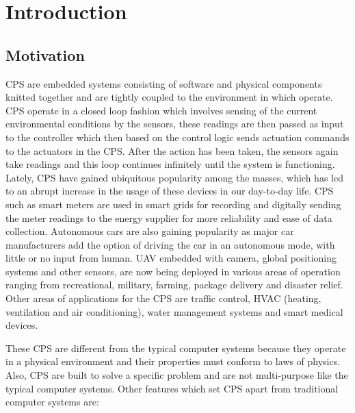 
\chapter{Introduction}
\label{ch:Introduction}

\section{Motivation}
\label{sec:Motivation}

\ac{CPS} are embedded systems consisting of software and physical components knitted together and are tightly coupled to the environment in which operate. \ac{CPS} operate in a closed loop fashion which involves sensing of the current environmental conditions by the sensors, these readings are then passed as input to the controller which then based on the control logic sends actuation commands to the actuators in the \ac{CPS}. After the action has been taken, the sensors again take readings and this loop continues infinitely until the system is functioning. Lately, \ac{CPS} have gained ubiquitous popularity among the masses, which has led to an abrupt increase in the usage of these devices in our day-to-day life. \ac{CPS} such as smart meters are used in smart grids\cite{karnouskos2011cyber, ericsson2010cyber} for recording and digitally sending the meter readings to the energy supplier for more reliability and ease of data collection. Autonomous cars\cite{checkoway2011comprehensive, yang2014vehicle} are also gaining popularity as major car manufacturers add the option of driving the car in an autonomous mode, with little or no input from human. \ac{UAV}\cite{javaid2012cyber, mohammed2014uavs} embedded with camera, global positioning systems and other sensors, are now being deployed in various areas of operation ranging from recreational, military, farming, package delivery and disaster relief. Other areas of applications for the \ac{CPS} are traffic control, HVAC (heating, ventilation and air conditioning), water management systems and smart medical devices.

These \ac{CPS} are different from the typical computer systems because they operate in a physical environment and their properties must conform to laws of physics. Also, \ac{CPS} are built to solve a specific problem and are not multi-purpose like the typical computer systems. Other features which set \ac{CPS} apart from traditional computer systems are:

